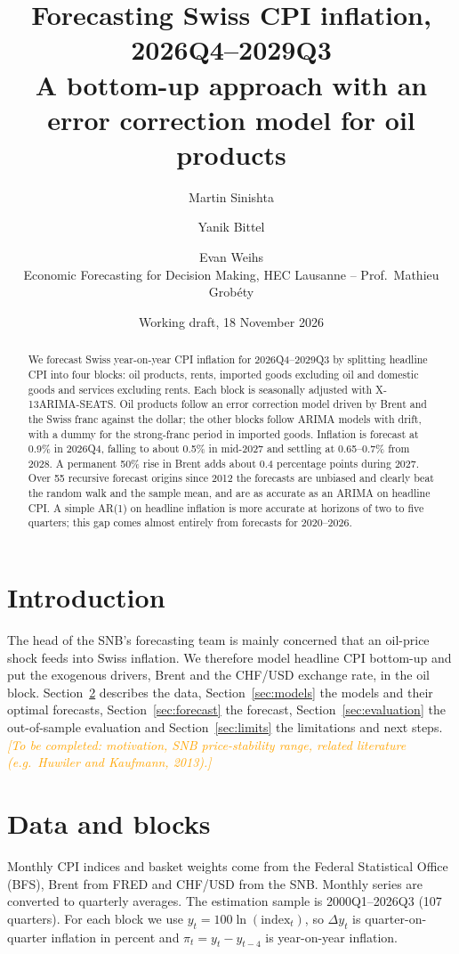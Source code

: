 \documentclass[11pt,a4paper]{article}
\title{Forecasting Swiss CPI inflation, 2026Q4--2029Q3\\[0.3em]
  \large A bottom-up approach with an error correction model for oil products}
\author{Martin Sinishta \and Yanik Bittel \and Evan Weihs\\[0.3em]
  \small Economic Forecasting for Decision Making, HEC Lausanne -- Prof.\ Mathieu Grob\'ety}
\date{Working draft, 18 November 2026}
\newcommand{\todo}[1]{\textcolor{orange}{\textit{[#1]}}}
\begin{document}
\maketitle

\begin{abstract}
\noindent We forecast Swiss year-on-year CPI inflation for 2026Q4--2029Q3 by splitting headline CPI
into four blocks: oil products, rents, imported goods excluding oil and domestic goods and services
excluding rents. Each block is seasonally adjusted with X-13ARIMA-SEATS. Oil products follow an error
correction model driven by Brent and the Swiss franc against the dollar; the other blocks follow
ARIMA models with drift, with a dummy for the strong-franc period in imported goods. Inflation is
forecast at 0.9\% in 2026Q4, falling to about 0.5\% in mid-2027 and settling at 0.65--0.7\% from
2028. A permanent 50\% rise in Brent adds about 0.4 percentage points during 2027. Over 55 recursive
forecast origins since 2012 the forecasts are unbiased and clearly beat the random walk and the
sample mean, and are as accurate as an ARIMA on headline CPI. A simple AR(1) on headline inflation is
more accurate at horizons of two to five quarters; this gap comes almost entirely from forecasts for
2020--2026.
\end{abstract}

\section{Introduction}
The head of the SNB's forecasting team is mainly concerned that an oil-price shock feeds into Swiss
inflation. We therefore model headline CPI bottom-up and put the exogenous drivers, Brent and the
CHF/USD exchange rate, in the oil block. Section~\ref{sec:data} describes the data,
Section~\ref{sec:models} the models and their optimal forecasts, Section~\ref{sec:forecast} the
forecast, Section~\ref{sec:evaluation} the out-of-sample evaluation and Section~\ref{sec:limits} the
limitations and next steps.
\todo{To be completed: motivation, SNB price-stability range, related literature (e.g.\ Huwiler and Kaufmann, 2013).}

\section{Data and blocks}\label{sec:data}
Monthly CPI indices and basket weights come from the Federal Statistical Office (BFS), Brent from
FRED and CHF/USD from the SNB. Monthly series are converted to quarterly averages. The estimation
sample is 2000Q1--2026Q3 (107 quarters). For each block we use $y_t = 100\ln(\text{index}_t)$, so
$\Delta y_t$ is quarter-on-quarter inflation in percent and $\pi_t = y_t - y_{t-4}$ is year-on-year
inflation.
\end{document}
